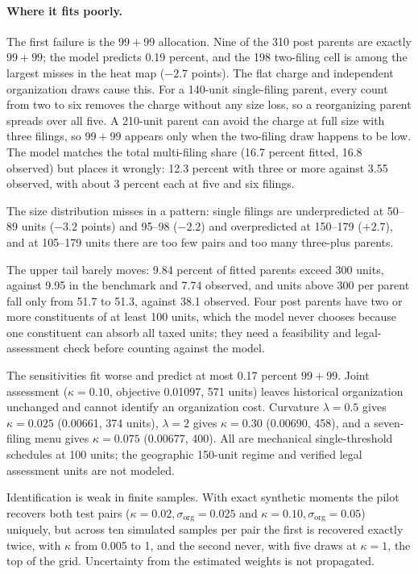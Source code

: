 \paragraph{Where it fits poorly.} The first failure is the $99+99$
allocation. Nine of the 310 post parents are exactly $99+99$; the model
predicts 0.19 percent, and the 198 two-filing cell is among the largest misses
in the heat map ($-2.7$ points). The flat charge and independent organization
draws cause this. For a 140-unit single-filing parent, every count from two
to six removes the charge without any size loss, so a reorganizing parent
spreads over all five. A 210-unit parent can avoid the charge at full size
with three filings, so $99+99$ appears only when the two-filing draw happens
to be low. The model matches the total multi-filing share (16.7 percent
fitted, 16.8 observed) but places it wrongly: 12.3 percent with three or more
against 3.55 observed, with about 3 percent each at five and six filings.

The size distribution misses in a pattern: single filings are underpredicted
at 50--89 units ($-3.2$ points) and 95--98 ($-2.2$) and overpredicted at
150--179 ($+2.7$), and at 105--179 units there are too few pairs and too many
three-plus parents.

The upper tail barely moves: 9.84 percent of fitted parents exceed 300 units,
against 9.95 in the benchmark and 7.74 observed, and units above 300 per
parent fall only from 51.7 to 51.3, against 38.1 observed. Four post parents
have two or more constituents of at least 100 units, which the model never
chooses because one constituent can absorb all taxed units; they need a
feasibility and legal-assessment check before counting against the model.

The sensitivities fit worse and predict at most 0.17 percent $99+99$. Joint assessment ($\kappa=0.10$,
objective 0.01097, 571 units) leaves historical organization unchanged and
cannot identify an organization cost. Curvature $\lambda=0.5$ gives
$\kappa=0.025$ (0.00661, 374 units), $\lambda=2$ gives $\kappa=0.30$ (0.00690,
458), and a seven-filing menu gives $\kappa=0.075$ (0.00677, 400). All are
mechanical single-threshold schedules at 100 units; the geographic 150-unit
regime and verified legal assessment units are not modeled.

Identification is weak in finite samples. With exact synthetic moments the
pilot recovers both test pairs ($\kappa=0.02,\sigma_{\mathrm{org}}=0.025$ and
$\kappa=0.10,\sigma_{\mathrm{org}}=0.05$) uniquely, but across ten simulated
samples per pair the first is recovered exactly twice, with $\kappa$ from
0.005 to 1, and the second never, with five draws at $\kappa=1$, the top of
the grid. Uncertainty from the estimated weights is not propagated.

